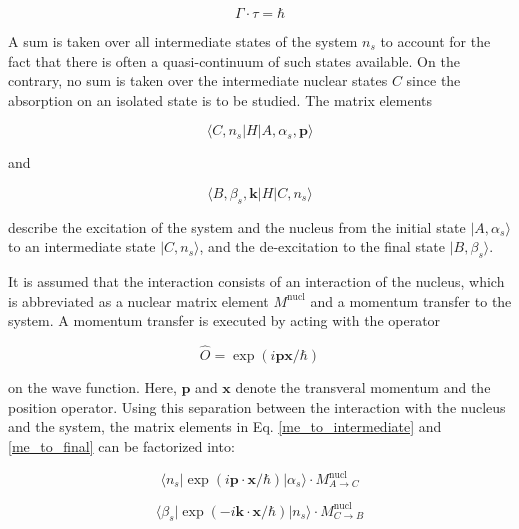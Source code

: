 \documentclass{article}
\begin{document}
\begin{equation}
\label{gamma_tau}
	\Gamma \cdot \tau = \hbar
\end{equation}

A sum is taken over all intermediate states of the system $n_s$ to account for the fact that there is often a quasi-continuum of such states available. On the contrary, no sum is taken over the intermediate nuclear states $C$ since the absorption on an isolated state is to be studied.
The matrix elements

\begin{equation}
\label{me_to_intermediate}
	\langle C, n_s | H | A, \alpha_s, \mathbf{p} \rangle
\end{equation}

and

\begin{equation}
\label{me_to_final}
	\langle B, \beta_s, \mathbf{k} | H | C, n_s \rangle
\end{equation}

describe the excitation of the system and the nucleus from the initial state $| A, \alpha_s \rangle$ to an intermediate state $| C, n_s \rangle$, and the de-excitation to the final state $| B, \beta_s \rangle$.

It is assumed that the interaction consists of an interaction of the nucleus, which is abbreviated as a nuclear matrix element $M^{\mathrm{nucl}}$ and a momentum transfer to the system. 
A momentum transfer is executed by acting with the operator

\begin{equation}
	\hat{O} = \exp{\left(i \mathbf{p} \mathbf{x} / \hbar\right)}
\end{equation}

on the wave function. Here, $\mathbf{p}$ and $\mathbf{x}$ denote the transveral momentum and the position operator.
Using this separation between the interaction with the nucleus and the system, the matrix elements in Eq. \ref{me_to_intermediate} and \ref{me_to_final} can be factorized into:

\begin{equation}
\label{me_to_intermediate_factorized}
\langle n_s | \exp{\left( i \mathbf{p} \cdot \mathbf{x} / \hbar \right)} | \alpha_s \rangle \cdot M^{\mathrm{nucl}}_{A \to C}
\end{equation}

\begin{equation}
\label{me_to_final_factorized}
\langle \beta_s | \exp{\left( - i \mathbf{k} \cdot \mathbf{x} / \hbar \right)} | n_s \rangle \cdot M^{\mathrm{nucl}}_{C \to B}
\end{equation}
\end{document}
